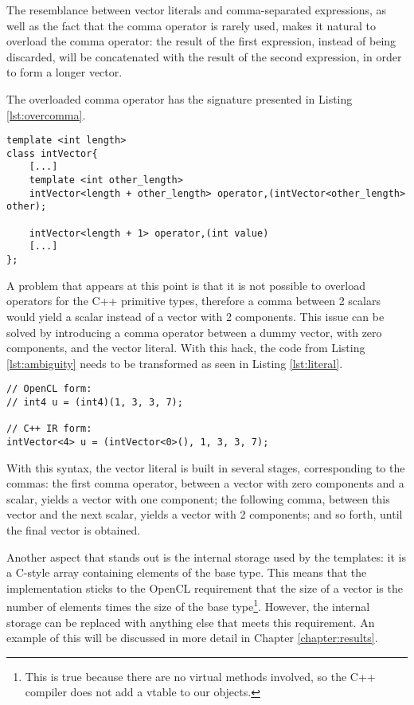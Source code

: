 The resemblance between vector literals and comma-separated expressions, as well as the fact that the comma operator is rarely used, makes it natural to overload the comma operator: the result of the first expression, instead of being discarded, will be concatenated with the result of the second expression, in order to form a longer vector.

The overloaded comma operator has the signature presented in Listing \ref{lst:overcomma}. 
\begin{lstlisting}[label=lst:overcomma, caption=Signature of the comma operator]
template <int length>
class intVector{
	[...]
	template <int other_length>
	intVector<length + other_length> operator,(intVector<other_length> other);
	
	intVector<length + 1> operator,(int value)
	[...]
};	
\end{lstlisting}

A problem that appears at this point is that it is not possible to overload operators for the C++ primitive types, therefore a comma between 2 scalars would yield a scalar instead of a vector with 2 components. This issue can be solved by introducing a comma operator between a dummy vector, with zero components, and the vector literal. With this hack, the code from Listing \ref{lst:ambiguity} needs to be transformed as seen in Listing \ref{lst:literal}.

\begin{lstlisting}[label=lst:literal, caption=Translation of an OpenCL vector literal to the C++ IR]
// OpenCL form:
// int4 u = (int4)(1, 3, 3, 7);

// C++ IR form:
intVector<4> u = (intVector<0>(), 1, 3, 3, 7);
\end{lstlisting}

With this syntax, the vector literal is built in several stages, corresponding to the commas: the first comma operator, between a vector with zero components and a scalar, yields a vector with one component; the following comma, between this vector and the next scalar, yields a vector with 2 components; and so forth, until the final vector is obtained. 


Another aspect that stands out is the internal storage used by the templates: it is a C-style array containing elements of the base type. This means that the implementation sticks to the OpenCL requirement that the size of a vector is the number of elements times the size of the base type\footnote{This is true because there are no virtual methods involved, so the C++ compiler does not add a vtable to our objects.}. However, the internal storage can be replaced with anything else that meets this requirement. An example of this will be discussed in more detail in Chapter \ref{chapter:results}.


